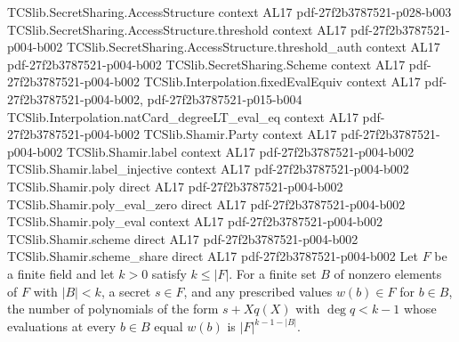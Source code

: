\begin{theorem}
\label{TCSlib.Shamir.natCard_coins_view}
\leanok
\proofstep
  {TCSlib.SecretSharing.AccessStructure}
  {context}
  {AL17}
  {pdf-27f2b3787521-p028-b003}
\proofstep
  {TCSlib.SecretSharing.AccessStructure.threshold}
  {context}
  {AL17}
  {pdf-27f2b3787521-p004-b002}
\proofstep
  {TCSlib.SecretSharing.AccessStructure.threshold_auth}
  {context}
  {AL17}
  {pdf-27f2b3787521-p004-b002}
\proofstep
  {TCSlib.SecretSharing.Scheme}
  {context}
  {AL17}
  {pdf-27f2b3787521-p004-b002}
\proofstep
  {TCSlib.Interpolation.fixedEvalEquiv}
  {context}
  {AL17}
  {pdf-27f2b3787521-p004-b002,
    pdf-27f2b3787521-p015-b004}
\proofstep
  {TCSlib.Interpolation.natCard_degreeLT_eval_eq}
  {context}
  {AL17}
  {pdf-27f2b3787521-p004-b002}
\proofstep
  {TCSlib.Shamir.Party}
  {context}
  {AL17}
  {pdf-27f2b3787521-p004-b002}
\proofstep
  {TCSlib.Shamir.label}
  {context}
  {AL17}
  {pdf-27f2b3787521-p004-b002}
\proofstep
  {TCSlib.Shamir.label_injective}
  {context}
  {AL17}
  {pdf-27f2b3787521-p004-b002}
\proofstep
  {TCSlib.Shamir.poly}
  {direct}
  {AL17}
  {pdf-27f2b3787521-p004-b002}
\proofstep
  {TCSlib.Shamir.poly_eval_zero}
  {direct}
  {AL17}
  {pdf-27f2b3787521-p004-b002}
\proofstep
  {TCSlib.Shamir.poly_eval}
  {context}
  {AL17}
  {pdf-27f2b3787521-p004-b002}
\proofstep
  {TCSlib.Shamir.scheme}
  {direct}
  {AL17}
  {pdf-27f2b3787521-p004-b002}
\proofstep
  {TCSlib.Shamir.scheme_share}
  {direct}
  {AL17}
  {pdf-27f2b3787521-p004-b002}
Let $F$ be a finite field and let $k>0$ satisfy $k\le |F|$. For a finite set $B$ of
nonzero elements of $F$ with $|B|<k$, a secret $s\in F$, and any prescribed values
$w(b)\in F$ for $b\in B$, the number of polynomials of the form $s+Xq(X)$ with $\deg
q<k-1$ whose evaluations at every $b\in B$ equal $w(b)$ is $|F|^{k-1-|B|}$.
\end{theorem}
